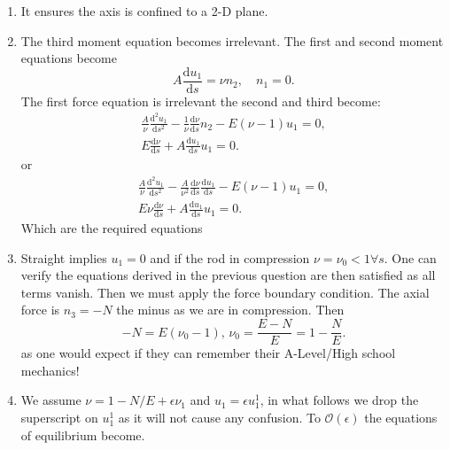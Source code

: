 \documentclass[]{article}
\newcommand{\rmd}{\mathrm{d}}
\newcommand{\deriv}[2]{\frac{\rmd#1}{\rmd #2}}
\newcommand{\derivn}[3]{\frac{\rmd^{#3} #1}{\rmd #2^{#3}}}
\begin{document}
\begin{enumerate}[label=(\alph*)]
{Next the moment equations. The moment derivative is 
\begin{equation}
\deriv{m_i}{s}{\bf d}_i +m_i\deriv{}{s}{\bf d}_i. 
\end{equation}
The only change with stretchability form the standard system derived in class is that the term ${|bf d}_3\times{\bf n}$ is replaced by  $\rmd {\bf r}/\rmd s\times {\bf n}=\nu {\bf d}_3\times{\bf n}$ so the moment equations become:
\begin{align}
A\deriv{u_1}{s}+ u_2u_3(C-A)-\nu n_2 =0,\\
\nonumber B\deriv{u_2}{s}+ u_1u_3(A-C)+\nu n_1=0,\\
\nonumber C\deriv{u_3}{s}=0.
\end{align}
(note that the twist is still constant)
}\item{
It ensures the axis is confined to a 2-D  plane. 
}\item{
The third moment equation becomes irrelevant. The first and second moment equations become
\begin{equation}
A\deriv{u_1}{s} =\nu n_2,\quad n_1=0.
\end{equation}
The first force equation is irrelevant the second and third become:
\begin{align}
\frac{A}{\nu}\derivn{u_1}{s}{2}-\frac{1}{\nu}\deriv{\nu}{s}n_2 -E(\nu-1)u_1 =0,\\
E\deriv{\nu}{s} +A\deriv{u_1}{s}u_1=0.
\end{align}
or
\begin{align}
\frac{A}{\nu}\derivn{u_1}{s}{2}-\frac{A}{\nu^2}\deriv{\nu}{s}\deriv{u_1}{s} -E(\nu-1)u_1 =0,\\
E\nu\deriv{\nu}{s} +A\deriv{u_1}{s}u_1=0.
\end{align}
Which are the required equations
}\item{
Straight implies $u_1=0$ and if the rod in compression $\nu=\nu_0<1\forall s$. One can verify the equations derived in the previous question are then satisfied as all terms vanish.  Then we must apply the force boundary condition. The axial force is $n_3 = -N$ the minus as we are in compression. Then 
\begin{equation}
-N = E(\nu_0-1),\,\nu_0 = \frac{E-N}{E} =1-\frac{N}{E}.
\end{equation}
as one would expect  if they can remember their A-Level/High school mechanics!
}\item{
We assume $\nu = 1-N/E+\epsilon \nu_1$ and $u_1 =\epsilon u_1^1$, in what follows we drop the superscript on $u_1^1$ as it will not cause any confusion. To $\mathcal{O}(\epsilon)$ the equations of equilibrium become. 

}
\end{enumerate}
\end{document}
